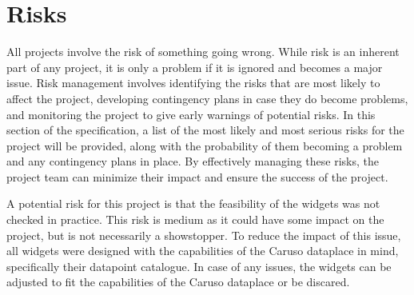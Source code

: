 \chapter{Risks}

All projects involve the risk of something going wrong. While risk is an inherent part of any project, it is only a problem if it is ignored and becomes a major issue. Risk management involves identifying the risks that are most likely to affect the project, developing contingency plans in case they do become problems, and monitoring the project to give early warnings of potential risks. In this section of the specification, a list of the most likely and most serious risks for the project will be provided, along with the probability of them becoming a problem and any contingency plans in place. By effectively managing these risks, the project team can minimize their impact and ensure the success of the project.


A potential risk for this project is that the feasibility of the widgets was not checked in practice. This risk is medium as it could have some impact on the project, but is not necessarily a showstopper. To reduce the impact of this issue, all widgets were designed with the capabilities of the Caruso dataplace in mind, specifically their datapoint catalogue. In case of any issues, the widgets can be adjusted to fit the capabilities of the Caruso dataplace or be discared.

